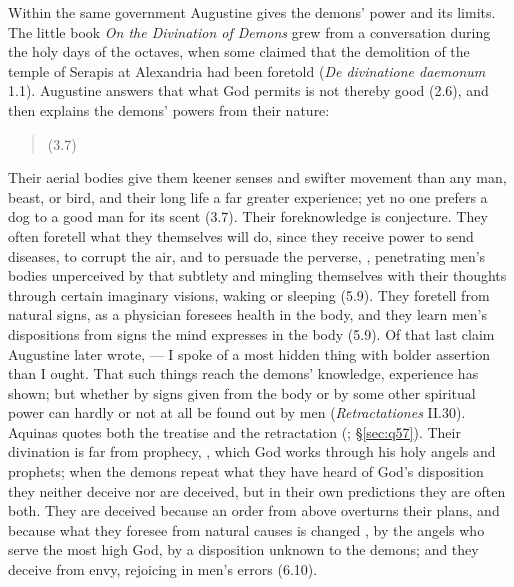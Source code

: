 Within the same government Augustine gives the demons' power and its
limits. The little book \emph{On the Divination of Demons} grew from a
conversation during the holy days of the octaves, when some claimed that the
demolition of the temple of Serapis at Alexandria had been foretold
(\emph{De divinatione daemonum} 1.1). Augustine answers that what God
permits is not thereby good (2.6), and then explains the demons' powers
from their nature:
\begin{quote}
 (3.7)
\end{quote}
Their aerial bodies give them keener senses and swifter movement than
any man, beast, or bird, and their long life a far greater experience;
yet no one prefers a dog to a good man for its scent (3.7). Their
foreknowledge is conjecture. They often foretell what they themselves
will do, since they receive power to send diseases, to corrupt the air,
and to persuade the perverse, , penetrating
men's bodies unperceived by that subtlety and mingling themselves with
their thoughts through certain imaginary visions, waking or sleeping
(5.9). They foretell from natural signs, as a physician foresees health
in the body, and they learn men's dispositions from signs the mind
expresses in the body (5.9). Of
that last claim Augustine later wrote,  --- I spoke of a most hidden thing
with bolder assertion than I ought. That such things reach the demons'
knowledge, experience has shown; but whether by signs given from the body
or by some other spiritual power can hardly or not at all be found out by
men
(\emph{Retractationes} II.30). Aquinas quotes both the treatise and the
retractation (; \S\ref{sec:q57}). Their divination is
far from prophecy, , which God works through his holy angels and prophets; when the
demons repeat what they have heard of God's disposition they neither
deceive nor are deceived, but in their own predictions they are often
both. They are deceived because an order from above overturns their
plans, and because what they foresee from natural causes is changed
, by the angels who serve the most high God, by a disposition
unknown to the demons; and they deceive from envy, rejoicing in men's
errors (6.10).

